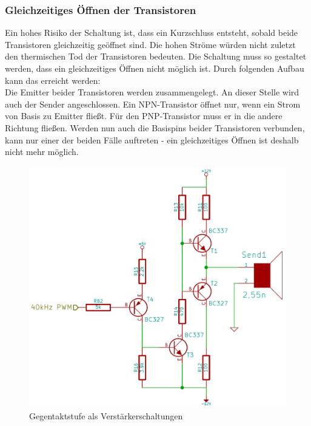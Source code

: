 \subsubsection{Gleichzeitiges Öffnen der Transistoren}
Ein hohes Risiko der Schaltung ist, dass ein Kurzschluss entsteht, sobald beide Transistoren gleichzeitig geöffnet sind. Die hohen Ströme würden nicht zuletzt den thermischen Tod der Transistoren bedeuten. Die Schaltung muss so gestaltet werden, dass ein gleichzeitiges Öffnen nicht möglich ist. Durch folgenden Aufbau kann das erreicht werden:\\
Die Emitter beider Transistoren werden zusammengelegt. An dieser Stelle wird auch der Sender angeschlossen. Ein NPN-Transistor öffnet nur, wenn ein Strom von Basis zu Emitter fließt. Für den PNP-Transistor muss er in die andere Richtung fließen. Werden nun auch die Basispins beider Transistoren verbunden, kann nur einer der beiden Fälle auftreten - ein gleichzeitiges Öffnen ist deshalb nicht mehr möglich.
\begin{figure}[H]
\centering
\includegraphics[scale=0.6]{images/push_pull.png}
\caption{Gegentaktstufe als Verstärkerschaltungen} \label{img:I4}
\end{figure}


